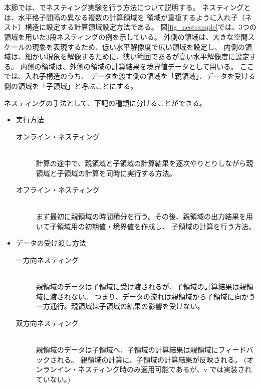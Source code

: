 \section{\SecAdvanceNesting} \label{sec:nest_exp}

本節では、\scalerm でネスティング実験を行う方法について説明する。
ネスティングとは、水平格子間隔の異なる複数の計算領域を
領域が重複するように入れ子（ネスト）構造に設定する計算領域設定方法である。
図\ref{fig_nestsample}では、3つの領域を用いた3段ネスティングの例を示している。
外側の領域は、大きな空間スケールの現象を表現するため、低い水平解像度で広い領域を設定し、
内側の領域は、細かい現象を解像するために、狭い範囲であるが高い水平解像度に設定する。
内側の領域は、外側の領域の計算結果を境界値データとして用いる。
ここでは、入れ子構造のうち、
データを渡す側の領域を「親領域」、データを受ける側の領域を「子領域」と呼ぶことにする。

ネスティングの手法として、下記の種類に分けることができる。
\begin{itemize}
\item 実行方法
\begin{description}
 \item[オンライン・ネスティング]\mbox{}\\
計算の途中で、親領域と子領域の計算結果を逐次やりとりしながら親領域と子領域の計算を同時に実行する方法。
 \item[オフライン・ネスティング]\mbox{}\\
まず最初に親領域の時間積分を行う。その後、親領域の出力結果を用いて子領域用の初期値・境界値を作成し、
子領域の計算を行う方法。
\end{description}
\item データの受け渡し方法
\begin{description}
 \item[一方向ネスティング]\mbox{}\\
親領域のデータは子領域に受け渡されるが、子領域の計算結果は親領域に渡されない。
つまり、データの流れは親領域から子領域に向かう一方通行。親領域は子領域の結果の影響を受けない。
 \item[双方向ネスティング]\mbox{}\\
親領域のデータは子領域へ、子領域の計算結果は親領域にフィードバックされる。
親領域の計算に、子領域の計算結果が反映される。
(オンランイン・ネスティング時のみ適用可能であるが、\scalerm v{\version} では実装されていない。)
\end{description}
\end{itemize}

